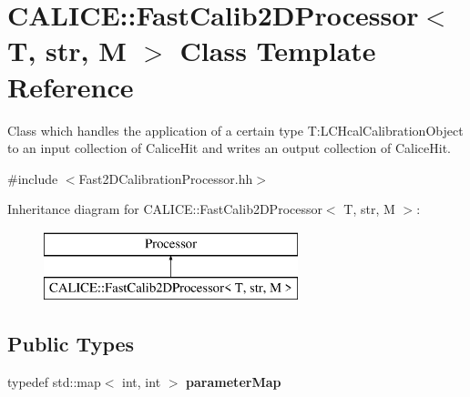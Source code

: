 \section{C\-A\-L\-I\-C\-E\-:\-:Fast\-Calib2\-D\-Processor$<$ T, str, M $>$ Class Template Reference}
\label{classCALICE_1_1FastCalib2DProcessor}


Class which handles the application of a certain type T\-:L\-C\-Hcal\-Calibration\-Object to an input collection of Calice\-Hit and writes an output collection of Calice\-Hit.  




{\ttfamily \#include $<$Fast2\-D\-Calibration\-Processor.\-hh$>$}

Inheritance diagram for C\-A\-L\-I\-C\-E\-:\-:Fast\-Calib2\-D\-Processor$<$ T, str, M $>$\-:\begin{figure}[H]
\begin{center}
\leavevmode
\includegraphics[height=2.000000cm]{classCALICE_1_1FastCalib2DProcessor}
\end{center}
\end{figure}
\subsection*{Public Types}
\begin{DoxyCompactItemize}
\item 
typedef std\-::map$<$ int, int $>$ {\bfseries parameter\-Map}\label{classCALICE_1_1FastCalib2DProcessor_a1a398176ac86386375acd10b92a890df}

\end{DoxyCompactItemize}
